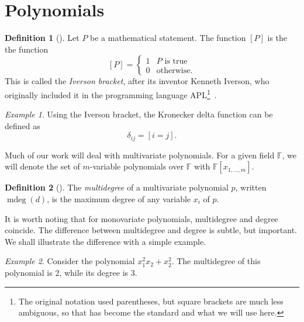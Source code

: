 \documentclass[english]{reedthesis}
\theoremstyle{plain}
\theoremstyle{definition}
\newtheorem{defn}[defn]{Definition}
\theoremstyle{remark}
\newtheorem{example}{Example}[thm]
\DeclareMathOperator{\mdeg}{mdeg}
\begin{document}
\section{Polynomials}\label{sec:polynomial}

\begin{defn}[{\cite{Knu92}}]\label{def:iverson-bracket}
  Let $P$ be a mathematical statement. The function $[P]$ is the the function
  \begin{equation}\label{eqn:iverson-bracket}
    [P] = \begin{cases}
      1 & P \text{ is true} \\
      0 & \text{otherwise.}
    \end{cases}
  \end{equation}
  This is called the \emph{Iverson bracket}, after its inventor Kenneth Iverson,
  who originally included it in the programming language APL\footnote{The
    original notation used parentheses, but square brackets are much less
    ambiguous, so that has become the standard and what we will use
    here.}~\cite[11]{APL}.
\end{defn}

\begin{example}
  Using the Iverson bracket, the Kronecker delta function can be defined as
  \[
    \delta_{ij} = [i = j].
  \]
\end{example}

Much of our work will deal with multivariate polynomials. For a given field
$\mathbb{F}$, we will denote the set of $m$-variable polynomials over
$\mathbb{F}$ with $\mathbb{F}[x_{1, \ldots, m}]$.

\begin{defn}[{\cite[8]{AW09}}]\label{def:mdeg}
  The \emph{multidegree} of a multivariate polynomial $p$, written $\mdeg(d)$,
  is the maximum degree of any variable $x_{i}$ of $p$.
\end{defn}

It is worth noting that for monovariate polynomials, multidegree and degree
coincide. The difference between multidegree and degree is subtle, but
important. We shall illustrate the difference with a simple example.

\begin{example}
  Consider the polynomial $x_{1}^{2}x_{2} + x_{2}^{2}$. The multidegree of this
  polynomial is 2, while its degree is 3.
\end{example}
\end{document}
